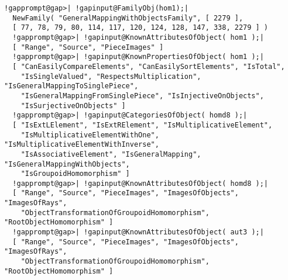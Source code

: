 \documentclass[a4paper,11pt]{report}
\begin{document}
{{\begin{Verbatim}[commandchars=!@|,fontsize=\small,frame=single,label=Example]
  !gapprompt@gap>| !gapinput@FamilyObj(hom1);|
  NewFamily( "GeneralMappingWithObjectsFamily", [ 2279 ], 
  [ 77, 78, 79, 80, 114, 117, 120, 124, 128, 147, 338, 2279 ] )
  !gapprompt@gap>| !gapinput@KnownAttributesOfObject( hom1 );|
  [ "Range", "Source", "PieceImages" ]
  !gapprompt@gap>| !gapinput@KnownPropertiesOfObject( hom1 );|
  [ "CanEasilyCompareElements", "CanEasilySortElements", "IsTotal", 
    "IsSingleValued", "RespectsMultiplication", "IsGeneralMappingToSinglePiece",
    "IsGeneralMappingFromSinglePiece", "IsInjectiveOnObjects", 
    "IsSurjectiveOnObjects" ]
  !gapprompt@gap>| !gapinput@CategoriesOfObject( homd8 );|
  [ "IsExtLElement", "IsExtRElement", "IsMultiplicativeElement", 
    "IsMultiplicativeElementWithOne", "IsMultiplicativeElementWithInverse", 
    "IsAssociativeElement", "IsGeneralMapping", "IsGeneralMappingWithObjects", 
    "IsGroupoidHomomorphism" ]
  !gapprompt@gap>| !gapinput@KnownAttributesOfObject( homd8 );|
  [ "Range", "Source", "PieceImages", "ImagesOfObjects", "ImagesOfRays", 
    "ObjectTransformationOfGroupoidHomomorphism", "RootObjectHomomorphism" ]
  !gapprompt@gap>| !gapinput@KnownAttributesOfObject( aut3 );|
  [ "Range", "Source", "PieceImages", "ImagesOfObjects", "ImagesOfRays", 
    "ObjectTransformationOfGroupoidHomomorphism", "RootObjectHomomorphism" ]
  
\end{Verbatim}
 }

 }

            
\end{document}
